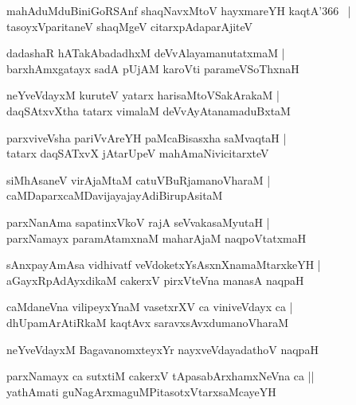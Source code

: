\documentclass[twoside,12pt,openright]{book}
\newcounter{shloka}[chapter]
\begin{document}
\begin{shloka}%
mahAduMduBiniGoRSAnf shaqNavxMtoV hayxmareYH kaqtA\char'366 ~|\\
tasoyxVparitaneV shaqMgeV citarxpAdaparAjiteV 
\end{shloka}

\begin{shloka}%
dadashaR hATakAbadadhxM deVvAlayamanutatxmaM |\\
barxhAmxgatayx sadA pUjAM karoVti parameVSoThxnaH
\end{shloka}

\begin{shloka}%
neYveVdayxM kuruteV yatarx harisaMtoVSakArakaM |\\
daqSAtxvXtha tatarx vimalaM deVvAyAtanamaduBxtaM 
\end{shloka}

\begin{shloka}%
parxviveVsha pariVvAreYH paMcaBisasxha saMvaqtaH |\\
tatarx daqSATxvX jAtarUpeV mahAmaNivicitarxteV
\end{shloka}

\begin{shloka}%
siMhAsaneV virAjaMtaM catuVBuRjamanoVharaM |\\
caMDaparxcaMDavijayajayAdiBirupAsitaM 
\end{shloka}

\begin{shloka}%
parxNanAma sapatinxVkoV rajA seVvakasaMyutaH |\\
parxNamayx paramAtamxnaM maharAjaM naqpoVtatxmaH 
\end{shloka}

\begin{shloka}%
sAnxpayAmAsa vidhivatf veVdoketxYsAsxnXnamaMtarxkeYH |\\
aGayxRpAdAyxdikaM cakerxV pirxVteVna manasA naqpaH 
\end{shloka}

\begin{shloka}%
caMdaneVna vilipeyxYnaM vasetxrXV ca viniveVdayx ca |\\
dhUpamArAtiRkaM kaqtAvx saravxsAvxdumanoVharaM 
\end{shloka}

\begin{shloka}%
neYveVdayxM BagavanomxteyxYr nayxveVdayadathoV naqpaH 
\end{shloka}

\begin{shloka}%
parxNamayx ca sutxtiM cakerxV tApasabArxhamxNeVna ca ||\\
yathAmati guNagArxmaguMPitasotxVtarxsaMcayeYH 
\end{shloka}
\end{document}
